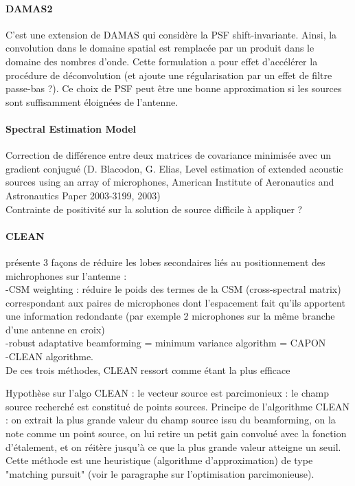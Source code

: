  
\paragraph{DAMAS2}
C'est une extension de DAMAS qui considère la PSF shift-invariante. Ainsi, la convolution dans le domaine spatial est remplacée par un produit dans le domaine des nombres d'onde. Cette formulation a pour effet d'accélérer la procédure de déconvolution (et ajoute une régularisation par un effet de filtre passe-bas ?). Ce choix de PSF peut être une bonne approximation si les sources sont suffisamment éloignées de l'antenne.

 
\paragraph{Spectral Estimation Model}
Correction de différence entre deux matrices de covariance minimisée avec un gradient conjugué (D. Blacodon, G. Elias, Level estimation of extended acoustic sources using an array of microphones, American Institute of Aeronautics and Astronautics Paper 2003-3199, 2003)\\
Contrainte de positivité sur la solution de source difficile à appliquer ?

\paragraph{CLEAN}


\cite{Dougherty1998} présente 3 façons de réduire les lobes secondaires liés au positionnement des michrophones sur l'antenne : \\
-CSM weighting : réduire le poids des termes de la CSM (cross-spectral matrix) correspondant aux paires de microphones dont l'espacement fait qu'ils apportent une information redondante (par exemple 2 microphones sur la même branche d'une antenne en croix)\\
-robust adaptative beamforming = minimum variance algorithm = CAPON\\
-CLEAN algorithme.\\
De ces trois méthodes, CLEAN ressort comme étant la plus efficace

Hypothèse sur l'algo CLEAN : le vecteur source est parcimonieux : le champ source recherché est constitué de points sources. Principe de l'algorithme CLEAN \citep{Hogbom1974} : on extrait la plus grande valeur du champ source issu du beamforming, on la note comme un point source, on lui retire un petit gain convolué avec la fonction d'étalement, et on réitère jusqu'à ce que la plus grande valeur atteigne un seuil. Cette méthode est une heuristique (algorithme d'approximation) de type "matching pursuit" (voir le paragraphe sur l'optimisation parcimonieuse).\\

